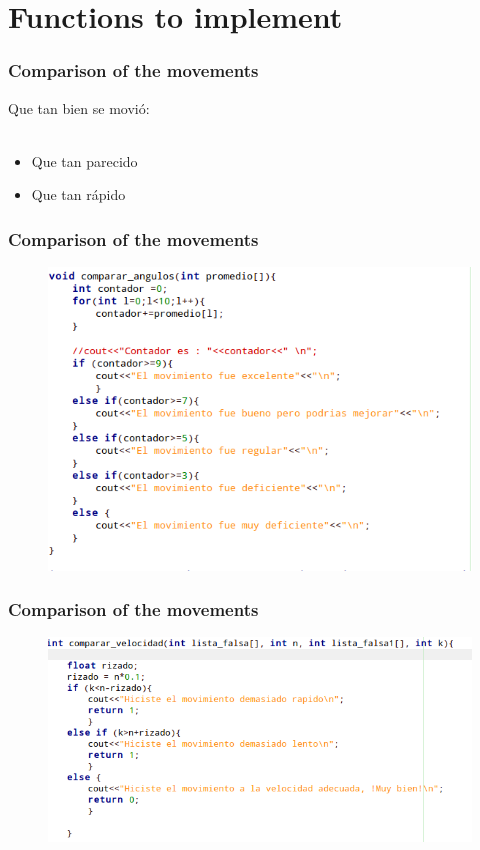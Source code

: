 \documentclass{beamer}
\begin{document}
\section{Functions to implement}

\begin{frame}
\frametitle{Comparison of the movements}

Que tan bien se movi\'o:
\\~\\
\begin{itemize}
\item Que tan parecido
\item Que tan r\'apido
\end{itemize}


\end{frame}


\begin{frame}
\frametitle{Comparison of the movements}

\begin{figure}
\includegraphics[width=0.7\linewidth]{24.png}
\end{figure}


\end{frame}


\begin{frame}
\frametitle{Comparison of the movements}

\begin{figure}
\includegraphics[width=0.7\linewidth]{25.png}
\end{figure}


\end{frame}
\end{document}
